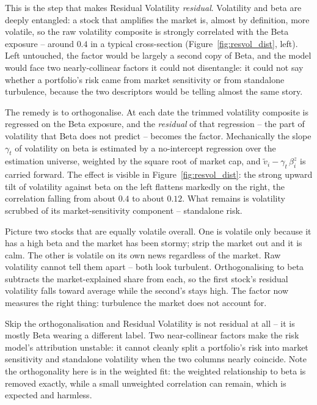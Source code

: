 \documentclass[11pt]{article}
\theoremstyle{definition}
\theoremstyle{plain}
\theoremstyle{remark}
\begin{document}
This is the step that makes Residual Volatility \emph{residual}. Volatility and beta are deeply entangled: a stock that amplifies the market is, almost by definition, more volatile, so the raw volatility composite is strongly correlated with the Beta exposure -- around $0.4$ in a typical cross-section (Figure~\ref{fig:resvol_dist}, left). Left untouched, the factor would be largely a second copy of Beta, and the model would face two nearly-collinear factors it could not disentangle: it could not say whether a portfolio's risk came from market sensitivity or from standalone turbulence, because the two descriptors would be telling almost the same story.

The remedy is to orthogonalise. At each date the trimmed volatility composite is regressed on the Beta exposure, and the \emph{residual} of that regression -- the part of volatility that Beta does not predict -- becomes the factor. Mechanically the slope $\gamma_t$ of volatility on beta is estimated by a no-intercept regression over the estimation universe, weighted by the square root of market cap, and $\tilde v_i - \gamma_t\,\beta^{z}_i$ is carried forward. The effect is visible in Figure~\ref{fig:resvol_dist}: the strong upward tilt of volatility against beta on the left flattens markedly on the right, the correlation falling from about $0.4$ to about $0.12$. What remains is volatility scrubbed of its market-sensitivity component -- standalone risk.

\begin{intuition}
Picture two stocks that are equally volatile overall. One is volatile only because it has a high beta and the market has been stormy; strip the market out and it is calm. The other is volatile on its own news regardless of the market. Raw volatility cannot tell them apart -- both look turbulent. Orthogonalising to beta subtracts the market-explained share from each, so the first stock's residual volatility falls toward average while the second's stays high. The factor now measures the right thing: turbulence the market does not account for.
\end{intuition}

\begin{pitfall}
Skip the orthogonalisation and Residual Volatility is not residual at all -- it is mostly Beta wearing a different label. Two near-collinear factors make the risk model's attribution unstable: it cannot cleanly split a portfolio's risk into market sensitivity and standalone volatility when the two columns nearly coincide. Note the orthogonality here is in the weighted fit: the weighted relationship to beta is removed exactly, while a small unweighted correlation can remain, which is expected and harmless.
\end{pitfall}
\end{document}
